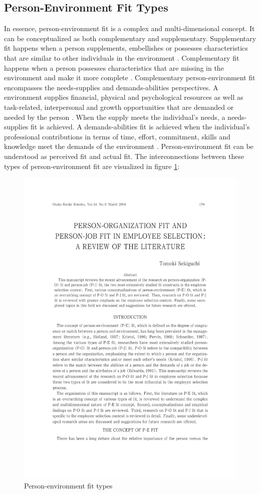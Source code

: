 \documentclass[draft,final]{thesisclass} %
\begin{document}
\subsection{Person-Environment Fit Types} \label{pef_types}
In essence, person-environment fit is a complex and multi-dimensional concept.
It can be conceptualized as both complementary and supplementary. 
Supplementary fit happens when a person supplements, embellishes or possesses characteristics that are similar to other individuals in the environment \parencite[180]{po_and_pj_fit_literature_review}.
Complementary fit happens when a person possesses characteristics that are missing in the environment and make it more complete \parencite[180]{po_and_pj_fit_literature_review}.
Complementary person-environment fit encompasses the needs-supplies and demands-abilities perspectives. 
A environment supplies financial, physical and psychological resources as well as task-related, interpersonal and growth opportunities that are demanded or needed by the person \parencite[180]{po_and_pj_fit_literature_review}.
When the supply meets the individual's needs, a needs-supplies fit is achieved.
A demands-abilities fit is achieved when the individual's professional contributions in terms of time, effort, commitment, skills and knowledge meet the demands of the environment \parencite[180]{po_and_pj_fit_literature_review}.
Person-environment fit can be understood as perceived fit and actual fit.
The interconnections between these types of person-environment fit are visualized in figure \ref{fig:person_environment_fit_types}:
\begin{figure}[H]
    \centering
    \includegraphics[scale=0.5,page=3,width=0.8\linewidth,trim={55 130 55 470},clip]{literature/po_and_pj_fit_literature_review.pdf}
    \caption{Person-environment fit types \parencite[3]{po_and_pj_fit_literature_review}}
    \label{fig:person_environment_fit_types}
\end{figure}
\end{document}
